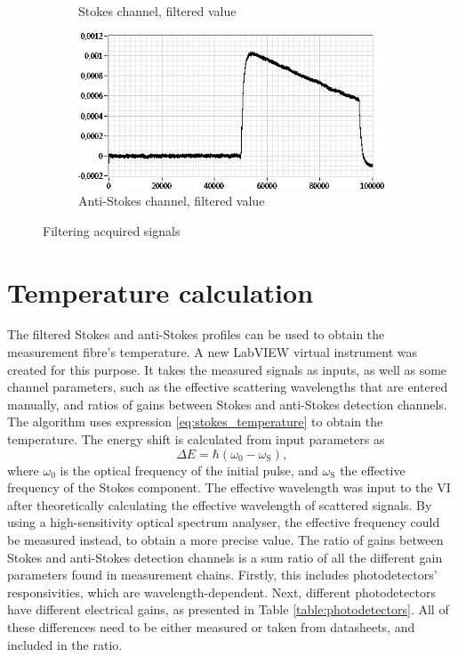 \documentclass{standalone}
\begin{document}
\begin{figure}[h]
\begin{subfigure}[b]{0.49\textwidth}
		\caption{Stokes channel, filtered value}
	\end{subfigure}
	\begin{subfigure}[b]{0.49\textwidth}
		\includegraphics[width=\textwidth]{daq_example_antistokes_filtered.png}
		\caption{Anti-Stokes channel, filtered value}
	\end{subfigure}
	\caption{Filtering acquired signals}
	\label{fig:daq_example}
\end{figure}


\section{Temperature calculation}

The filtered Stokes and anti-Stokes profiles can be used to obtain the measurement fibre's temperature. A new LabVIEW virtual instrument was created for this purpose. It takes the measured signals as inputs, as well as some channel parameters, such as the effective scattering wavelengths that are entered manually, and ratios of gains between Stokes and anti-Stokes detection channels. The algorithm uses expression \ref{eq:stokes_temperature} to obtain the temperature. The energy shift is calculated from input parameters as
\begin{equation}
\varDelta E = \hbar (\omega_0 - \omega_\textrm{S}) \textrm{,}
\end{equation}
where $\omega_0$ is the optical frequency of the initial pulse, and $\omega_\textrm{S}$ the effective frequency of the Stokes component. The effective wavelength was input to the VI after theoretically calculating the effective wavelength of scattered signals. By using a high-sensitivity optical spectrum analyser, the effective frequency could be measured instead, to obtain a more precise value. The ratio of gains between Stokes and anti-Stokes detection channels is a sum ratio of all the different gain parameters found in measurement chains. Firstly, this includes photodetectors' responsivities, which are wavelength-dependent. Next, different photodetectors have different electrical gains, as presented in Table \ref{table:photodetectors}. All of these differences need to be either measured or taken from datasheets, and included in the ratio. \\
\end{document}
